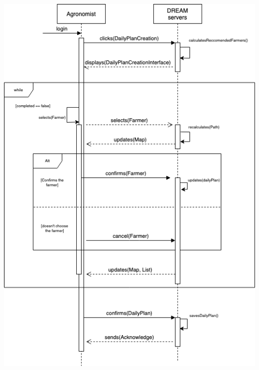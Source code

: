 \begin{center}
\includegraphics[scale=0.6]{Files/sequence_disgrams/thePNGs/agronomist_createPlan.png}\\
\end{center}

